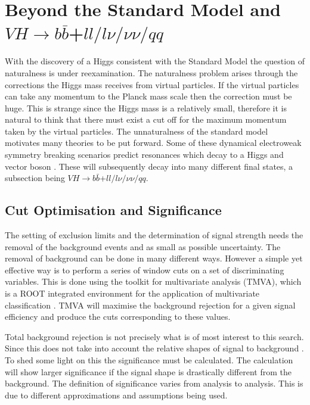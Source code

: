 \section{Beyond the Standard Model and $VH\rightarrow b\bar{b}$+$ll/l\nu/\nu\nu/qq$}
\label{resonance}
With the discovery of a Higgs consistent with the Standard Model the question of naturalness is under reexamination\cite{natural}. The naturalness problem arises through the corrections the Higgs mass receives from virtual particles. If the virtual particles can take any momentum to the Planck mass scale then the correction must be huge. This is strange since the Higgs mass is a relatively small, therefore it is natural to think that there must exist a cut off for the maximum momentum taken by the virtual particles.  
 The unnaturalness of the standard model motivates many theories to be put forward. Some of these dynamical electroweak symmetry breaking scenarios predict resonances which decay to a Higgs and vector boson \cite{resonance}. These will subsequently decay into many different final states, a subsection being $VH\rightarrow b\bar{b}$+$ll/l\nu/\nu\nu/qq$.

\subsection{Cut Optimisation and Significance}
\label{Significance}
The setting of exclusion limits and the determination of signal strength needs the removal of the background events and as small as possible uncertainty.
The removal of background can be done in many different ways. However a simple yet effective way is to perform a series of window cuts on a set of discriminating variables.  
This is done using the toolkit for multivariate analysis (TMVA), which is a ROOT integrated environment for the application of multivariate classification \cite{tmva}.
TMVA will maximise the background rejection for a given signal efficiency and produce the cuts corresponding to these values.

Total background rejection is not precisely what is of most interest to this search. Since this does not take into account the relative shapes of signal to background \cite{statphysics}. To shed some light on this the significance must be calculated. The calculation will show larger significance if the signal shape is drastically different from the background. The definition of significance varies from analysis to analysis. This is due to different approximations and assumptions being used. 


